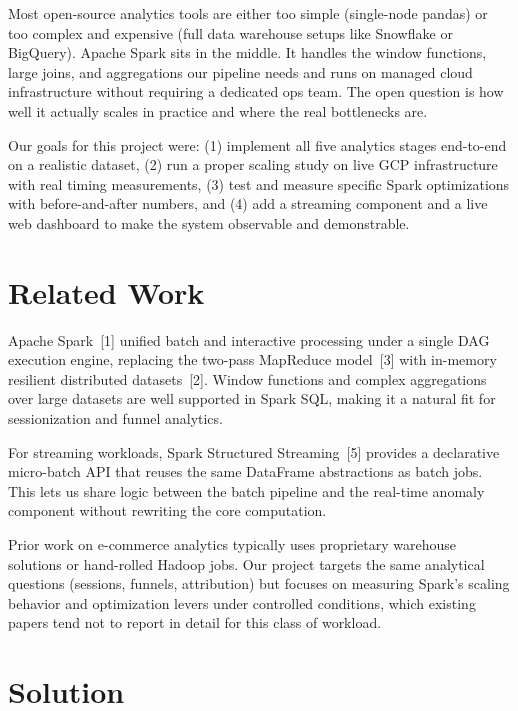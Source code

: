 \documentclass[letterpaper,twocolumn,10pt]{article}
\begin{document}
Most open-source analytics tools are either too simple (single-node pandas) or too
complex and expensive (full data warehouse setups like Snowflake or BigQuery). Apache
Spark sits in the middle. It handles the window functions, large joins, and
aggregations our pipeline needs and runs on managed cloud infrastructure without
requiring a dedicated ops team. The open question is how well it actually scales in
practice and where the real bottlenecks are.

Our goals for this project were: (1) implement all five analytics stages end-to-end on
a realistic dataset, (2) run a proper scaling study on live GCP infrastructure with
real timing measurements, (3) test and measure specific Spark optimizations with
before-and-after numbers, and (4) add a streaming component and a live web dashboard
to make the system observable and demonstrable.

\section{Related Work}

Apache Spark~[1] unified batch and interactive processing
under a single DAG execution engine, replacing the two-pass MapReduce
model~[3] with in-memory resilient distributed
datasets~[2]. Window functions and complex aggregations over
large datasets are well supported in Spark SQL, making it a natural fit for
sessionization and funnel analytics.

For streaming workloads, Spark Structured Streaming~[5]
provides a declarative micro-batch API that reuses the same DataFrame abstractions
as batch jobs. This lets us share logic between the batch pipeline and the real-time
anomaly component without rewriting the core computation.

Prior work on e-commerce analytics typically uses proprietary warehouse solutions
or hand-rolled Hadoop jobs. Our project targets the same analytical questions
(sessions, funnels, attribution) but focuses on measuring Spark's scaling behavior
and optimization levers under controlled conditions, which existing papers tend not
to report in detail for this class of workload.

\section{Solution}
\end{document}
